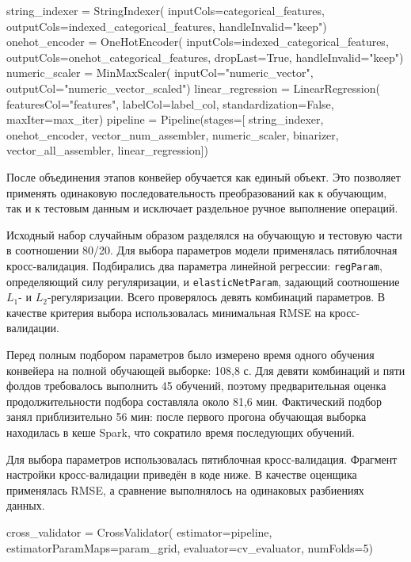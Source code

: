 \begin{code}
string_indexer = StringIndexer(
    inputCols=categorical_features,
    outputCols=indexed_categorical_features,
    handleInvalid="keep")
onehot_encoder = OneHotEncoder(
    inputCols=indexed_categorical_features,
    outputCols=onehot_categorical_features,
    dropLast=True, handleInvalid="keep")
numeric_scaler = MinMaxScaler(
    inputCol="numeric_vector",
    outputCol="numeric_vector_scaled")
linear_regression = LinearRegression(
    featuresCol="features", labelCol=label_col,
    standardization=False, maxIter=max_iter)
pipeline = Pipeline(stages=[
    string_indexer, onehot_encoder, vector_num_assembler,
    numeric_scaler, binarizer, vector_all_assembler,
    linear_regression])
\end{code}

После объединения этапов конвейер обучается как единый объект. Это позволяет применять одинаковую последовательность преобразований как к обучающим, так и к тестовым данным и исключает раздельное ручное выполнение операций.

Исходный набор случайным образом разделялся на обучающую и тестовую части в соотношении 80/20. Для выбора параметров модели применялась пятиблочная кросс-валидация. Подбирались два параметра линейной регрессии: \texttt{regParam}, определяющий силу регуляризации, и \texttt{elasticNetParam}, задающий соотношение $L_1$- и $L_2$-регуляризации. Всего проверялось девять комбинаций параметров. В качестве критерия выбора использовалась минимальная RMSE на кросс-валидации.

Перед полным подбором параметров было измерено время одного обучения конвейера на полной обучающей выборке: 108,8 с. Для девяти комбинаций и пяти фолдов требовалось выполнить 45 обучений, поэтому предварительная оценка продолжительности подбора составляла около 81,6 мин. Фактический подбор занял приблизительно 56 мин: после первого прогона обучающая выборка находилась в кеше Spark, что сократило время последующих обучений.

Для выбора параметров использовалась пятиблочная кросс-валидация. Фрагмент настройки кросс-валидации приведён в коде ниже. В качестве оценщика применялась RMSE, а сравнение выполнялось на одинаковых разбиениях данных.

\begin{code}
cross_validator = CrossValidator(
    estimator=pipeline,
    estimatorParamMaps=param_grid,
    evaluator=cv_evaluator,
    numFolds=5)
\end{code}

